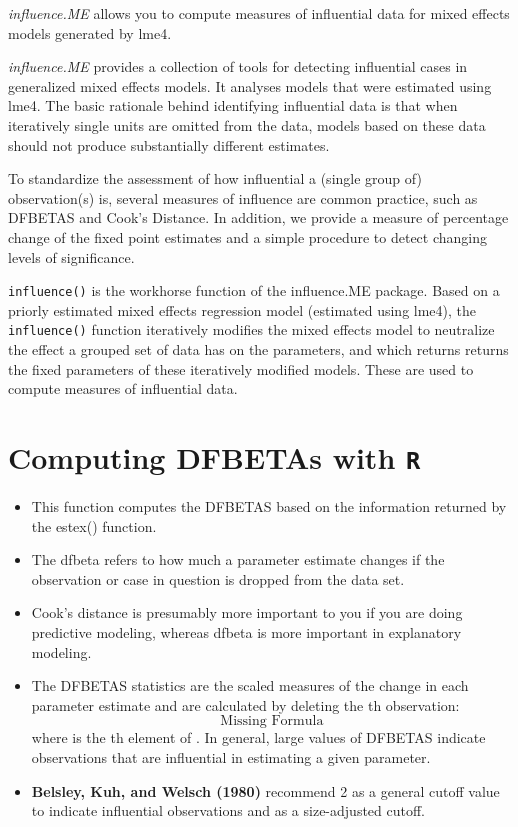 \documentclass[12pt, a4paper]{report}
\theoremstyle{plain}
\theoremstyle{definition}
\theoremstyle{remark}
\begin{document}
	\textit{influence.ME} allows you to compute measures of influential data for mixed effects models generated by lme4.
	
	\textit{influence.ME} provides a collection of tools for detecting influential cases in generalized mixed effects models. It analyses models that were estimated using lme4. The basic rationale behind identifying influential data is that when iteratively single units are omitted from the data, models based on these data should not produce substantially different estimates. 
	
	To standardize the assessment of how influential a (single group of) observation(s) is, several measures of influence are common practice, such as DFBETAS and Cook's Distance. In addition, we provide a measure of percentage change of the fixed point estimates and a simple procedure to detect changing levels of significance.
	
	\texttt{influence()} is the workhorse function of the influence.ME package. Based on a priorly estimated mixed effects regression model (estimated using lme4), the \texttt{influence()} function iteratively modifies the mixed effects model to neutralize the effect a grouped set of data has on the parameters, and which returns returns the fixed parameters of these iteratively modified models. These are used to compute measures of influential data.
	
	
	
	
	\section{Computing DFBETAs with \texttt{R}}
	
	\begin{itemize}
		\item This function computes the DFBETAS based on the information returned by the estex() function.
		\item The dfbeta refers to how much a parameter estimate changes if the observation or case in question is dropped from the data set.  
		\item Cook's distance is presumably more important to you if you are doing predictive modeling, whereas dfbeta is more important in explanatory modeling.
		
		\item The DFBETAS statistics are the scaled measures of the change in each parameter estimate and are calculated by deleting the th observation:
		\[ \mbox{Missing Formula}\]
		where  is the th element of .
		In general, large values of DFBETAS indicate observations that are influential in estimating a given parameter. \item \textbf{Belsley, Kuh, and Welsch (1980)} recommend 2 as a general cutoff value to indicate influential observations and  as a size-adjusted cutoff.
	\end{itemize}
	
\end{document}

